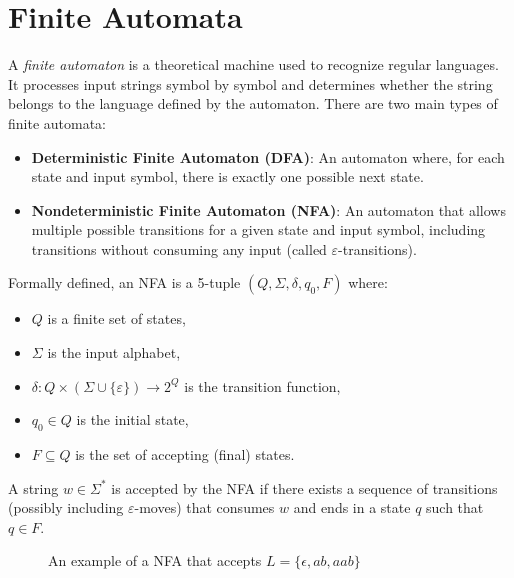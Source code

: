 \section{Finite Automata}
A \emph{finite automaton} is a theoretical machine used to recognize regular languages. It processes input strings symbol by symbol and determines whether the string belongs to the language defined by the automaton. There are two main types of finite automata:

\begin{itemize}
    \item \textbf{Deterministic Finite Automaton (DFA)}: An automaton where, for each state and input symbol, there is exactly one possible next state.
    \item \textbf{Nondeterministic Finite Automaton (NFA)}: An automaton that allows multiple possible transitions for a given state and input symbol, including transitions without consuming any input (called $\varepsilon$-transitions).
\end{itemize}

Formally defined, an NFA is a 5-tuple $(Q, \Sigma, \delta, q_0, F)$ where:

\begin{itemize}
    \item $Q$ is a finite set of states,
    \item $\Sigma$ is the input alphabet,
    \item $\delta: Q \times (\Sigma \cup \{\varepsilon\}) \rightarrow 2^Q$ is the transition function,
    \item $q_0 \in Q$ is the initial state,
    \item $F \subseteq Q$ is the set of accepting (final) states.
\end{itemize}

A string $w \in \Sigma^*$ is accepted by the NFA if there exists a sequence of transitions (possibly including $\varepsilon$-moves) that consumes $w$ and ends in a state $q$ such that $q \in F$.

\begin{figure}[H]
\centering
{}
\caption{An example of a NFA that accepts $L = \{\epsilon,ab,aab\}$}
\end{figure}


